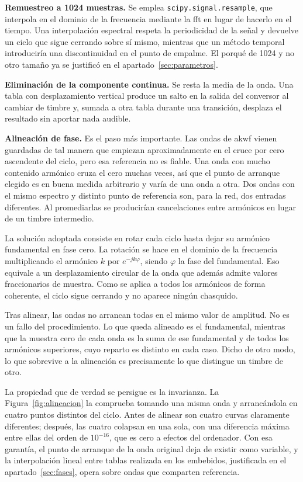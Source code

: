 \textbf{Remuestreo a 1024 muestras.} Se emplea \texttt{scipy.signal.resample},
que interpola en el dominio de la frecuencia mediante la \gls{fft} en lugar de
hacerlo en el tiempo. Una interpolación espectral
respeta la periodicidad de la señal y devuelve un ciclo que sigue cerrando
sobre sí mismo, mientras que un método temporal introduciría una discontinuidad
en el punto de empalme. El porqué de 1024 y no otro tamaño ya se justificó en
el apartado~\ref{sec:parametros}.

\textbf{Eliminación de la componente continua.} Se resta la media de la onda.
Una tabla con desplazamiento vertical produce un salto en la salida del
conversor al cambiar de timbre y, sumada a otra tabla durante una transición,
desplaza el resultado sin aportar nada audible.

\textbf{Alineación de fase.} Es el paso más importante. Las
ondas de \gls{akwf} vienen guardadas de tal manera que empiezan aproximadamente en el cruce por
cero ascendente del ciclo, pero esa referencia no es fiable. Una onda con mucho
contenido armónico cruza el cero muchas veces, así que el punto de arranque
elegido es en buena medida arbitrario y varía de una onda a otra. Dos ondas con
el mismo espectro y distinto punto de referencia son, para la red, dos entradas
diferentes. Al promediarlas se producirían cancelaciones entre armónicos en lugar de un
timbre intermedio.

La solución adoptada consiste en rotar cada ciclo hasta dejar su armónico
fundamental en fase cero. La rotación se hace en el dominio de la frecuencia
multiplicando el armónico $k$ por $e^{-jk\varphi}$, siendo $\varphi$ la fase del
fundamental. Eso equivale a un desplazamiento circular de la onda que además
admite valores fraccionarios de muestra. Como se aplica a todos los armónicos
de forma coherente, el ciclo sigue cerrando y no aparece ningún chasquido.

Tras alinear, las ondas no arrancan todas en el mismo valor de amplitud. 
No es un fallo del procedimiento. Lo que queda alineado es el fundamental,
mientras que la muestra cero de cada onda es la suma de ese fundamental y 
de todos los armónicos superiores, cuyo reparto es distinto en cada caso.
Dicho de otro modo, lo que sobrevive a la alineación es precisamente lo 
que distingue un timbre de otro.

La propiedad que de verdad se persigue es la invarianza. La
Figura~\ref{fig:alineacion} la comprueba tomando una misma onda y arrancándola
en cuatro puntos distintos del ciclo. Antes de alinear son cuatro curvas
claramente diferentes; después, las cuatro colapsan en una sola, con una
diferencia máxima entre ellas del orden de $10^{-16}$, que es cero a efectos del ordenador.
Con esa garantía, el punto de arranque de la onda original deja de existir como variable, 
y la interpolación lineal entre tablas realizada en los embebidos, justificada en el
apartado~\ref{sec:fases}, opera sobre ondas que comparten referencia.

